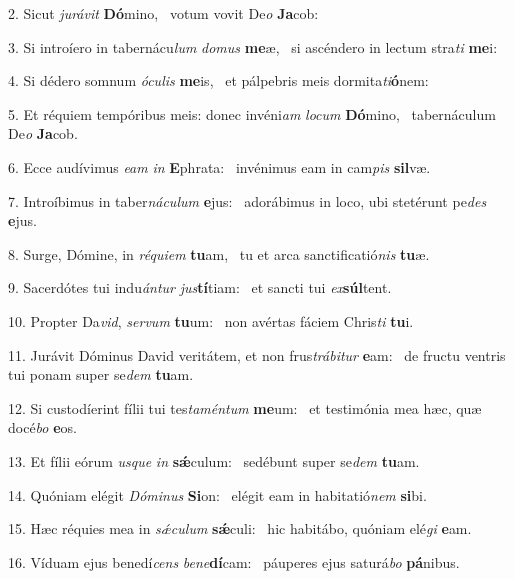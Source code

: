 2. Sicut \textit{ju}\textit{rá}\textit{vit} \textbf{Dó}mino, \ast\  votum vovit De\textit{o} \textbf{Ja}cob:\

3. Si introíero in tabernácu\textit{lum} \textit{do}\textit{mus} \textbf{me}æ, \ast\  si ascéndero in lectum stra\textit{ti} \textbf{me}i:\

4. Si dédero somnum \textit{ó}\textit{cu}\textit{lis} \textbf{me}is, \ast\  et pálpebris meis dormita\textit{ti}\textbf{ó}nem:\

5. Et réquiem tempóribus meis: donec invéni\textit{am} \textit{lo}\textit{cum} \textbf{Dó}mino, \ast\  tabernáculum De\textit{o} \textbf{Ja}cob.\

6. Ecce audívimus \textit{e}\textit{am} \textit{in} \textbf{E}phrata: \ast\  invénimus eam in cam\textit{pis} \textbf{sil}væ.\

7. Introíbimus in taber\textit{ná}\textit{cu}\textit{lum} \textbf{e}jus: \ast\  adorábimus in loco, ubi stetérunt pe\textit{des} \textbf{e}jus.\

8. Surge, Dómine, in \textit{ré}\textit{qui}\textit{em} \textbf{tu}am, \ast\  tu et arca sanctificatió\textit{nis} \textbf{tu}æ.\

9. Sacerdótes tui indu\textit{án}\textit{tur} \textit{jus}\textbf{tí}tiam: \ast\  et sancti tui \textit{ex}\textbf{súl}tent.\

10. Propter Da\textit{vid}, \textit{ser}\textit{vum} \textbf{tu}um: \ast\  non avértas fáciem Chris\textit{ti} \textbf{tu}i.\

11. Jurávit Dóminus David veritátem, et non frus\textit{trá}\textit{bi}\textit{tur} \textbf{e}am: \ast\  de fructu ventris tui ponam super se\textit{dem} \textbf{tu}am.\

12. Si custodíerint fílii tui tes\textit{ta}\textit{mén}\textit{tum} \textbf{me}um: \ast\  et testimónia mea hæc, quæ docé\textit{bo} \textbf{e}os.\

13. Et fílii eórum \textit{us}\textit{que} \textit{in} \textbf{sǽ}culum: \ast\  sedébunt super se\textit{dem} \textbf{tu}am.\

14. Quóniam elégit \textit{Dó}\textit{mi}\textit{nus} \textbf{Si}on: \ast\  elégit eam in habitatió\textit{nem} \textbf{si}bi.\

15. Hæc réquies mea in \textit{sǽ}\textit{cu}\textit{lum} \textbf{sǽ}culi: \ast\  hic habitábo, quóniam elé\textit{gi} \textbf{e}am.\

16. Víduam ejus benedí\textit{cens} \textit{be}\textit{ne}\textbf{dí}cam: \ast\  páuperes ejus saturá\textit{bo} \textbf{pá}nibus.\

